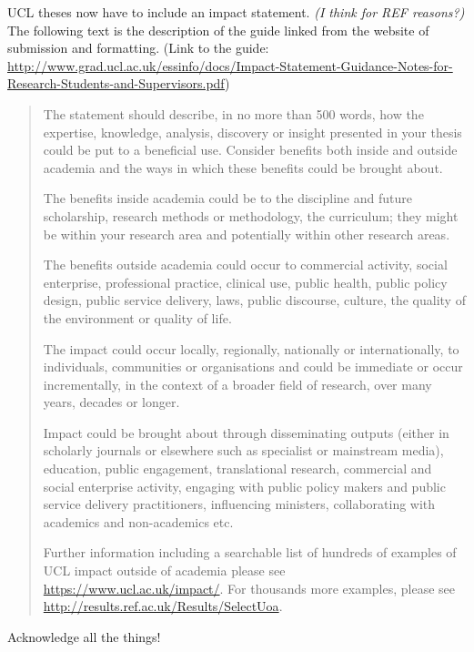 \begin{impactstatement}

	UCL theses now have to include an impact statement. \textit{(I think for REF reasons?)} The following text is the description of the guide linked from the website of submission and formatting. (Link to the guide: {\scriptsize \url{http://www.grad.ucl.ac.uk/essinfo/docs/Impact-Statement-Guidance-Notes-for-Research-Students-and-Supervisors.pdf}})

\begin{quote}
The statement should describe, in no more than 500 words, how the expertise, knowledge, analysis,
discovery or insight presented in your thesis could be put to a beneficial use. Consider benefits both
inside and outside academia and the ways in which these benefits could be brought about.

The benefits inside academia could be to the discipline and future scholarship, research methods or
methodology, the curriculum; they might be within your research area and potentially within other
research areas.

The benefits outside academia could occur to commercial activity, social enterprise, professional
practice, clinical use, public health, public policy design, public service delivery, laws, public
discourse, culture, the quality of the environment or quality of life.

The impact could occur locally, regionally, nationally or internationally, to individuals, communities or
organisations and could be immediate or occur incrementally, in the context of a broader field of
research, over many years, decades or longer.

Impact could be brought about through disseminating outputs (either in scholarly journals or
elsewhere such as specialist or mainstream media), education, public engagement, translational
research, commercial and social enterprise activity, engaging with public policy makers and public
service delivery practitioners, influencing ministers, collaborating with academics and non-academics
etc.

Further information including a searchable list of hundreds of examples of UCL impact outside of
academia please see \url{https://www.ucl.ac.uk/impact/}. For thousands more examples, please see
\url{http://results.ref.ac.uk/Results/SelectUoa}.
\end{quote}
\end{impactstatement}

        
\begin{acknowledgements}
Acknowledge all the things!
\end{acknowledgements}




